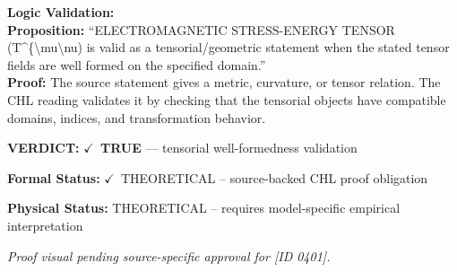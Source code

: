 \textbf{Logic Validation:}\\
\textbf{Proposition:} ``ELECTROMAGNETIC STRESS-ENERGY TENSOR (T\textasciicircum{}\{\textbackslash{}mu\textbackslash{}nu) is valid as a tensorial/geometric
statement when the stated tensor fields are well formed on the specified domain.''\\
\textbf{Proof:} The source statement gives a metric, curvature, or tensor relation. The CHL reading
validates it by checking that the tensorial objects have compatible domains, indices,
and transformation behavior.

\textbf{VERDICT:} \ensuremath{\checkmark}\ \textbf{TRUE} --- tensorial well-formedness validation

\textbf{Formal Status:} \ensuremath{\checkmark}\ THEORETICAL -- source-backed CHL proof obligation

\textbf{Physical Status:} THEORETICAL -- requires model-specific empirical interpretation
\par\vspace{0.45em}
\par
\vfill
\begingroup\footnotesize\itshape
Proof visual pending source-specific approval for [ID 0401].
\par\endgroup
\vfill
\endgroup
\endgroup
